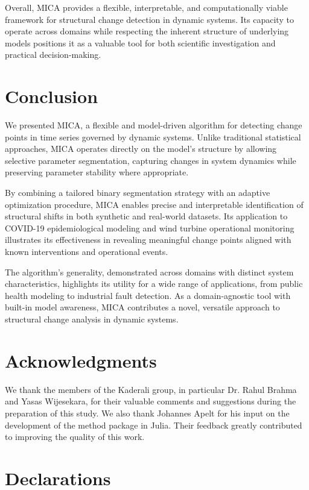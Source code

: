 \documentclass[10pt,letterpaper]{article}
\begin{document}
Overall, MICA provides a flexible, interpretable, and computationally viable framework for structural change detection in dynamic systems. Its capacity to operate across domains while respecting the inherent structure of underlying models positions it as a valuable tool for both scientific investigation and practical decision-making.



\section*{Conclusion}
We presented MICA, a flexible and model-driven algorithm for detecting change points in time series governed by dynamic systems. Unlike traditional statistical approaches, MICA operates directly on the model’s structure by allowing selective parameter segmentation, capturing changes in system dynamics while preserving parameter stability where appropriate.

By combining a tailored binary segmentation strategy with an adaptive optimization procedure, MICA enables precise and interpretable identification of structural shifts in both synthetic and real-world datasets. Its application to COVID-19 epidemiological modeling and wind turbine operational monitoring illustrates its effectiveness in revealing meaningful change points aligned with known interventions and operational events.

The algorithm's generality, demonstrated across domains with distinct system characteristics, highlights its utility for a wide range of applications, from public health modeling to industrial fault detection. As a domain-agnostic tool with built-in model awareness, MICA contributes a novel, versatile approach to structural change analysis in dynamic systems.

\section*{Acknowledgments}
We thank the members of the Kaderali group, in particular Dr. Rahul Brahma and Yasas Wijesekara, for their valuable comments and suggestions during the preparation of this study. We also thank Johannes Apelt for his input on the development of the method package in Julia. Their feedback greatly contributed to improving the quality of this work.  

\section*{Declarations}
\end{document}
